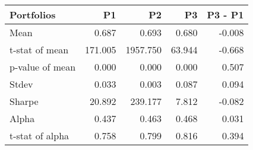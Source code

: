\begin{tabular}{lrrrr}
\toprule
Portfolios & P1 & P2 & P3 & P3 - P1 \\
\midrule
Mean & 0.687 & 0.693 & 0.680 & -0.008 \\
t-stat of mean & 171.005 & 1957.750 & 63.944 & -0.668 \\
p-value of mean & 0.000 & 0.000 & 0.000 & 0.507 \\
Stdev & 0.033 & 0.003 & 0.087 & 0.094 \\
Sharpe & 20.892 & 239.177 & 7.812 & -0.082 \\
Alpha & 0.437 & 0.463 & 0.468 & 0.031 \\
t-stat of alpha & 0.758 & 0.799 & 0.816 & 0.394 \\
\bottomrule
\end{tabular}
